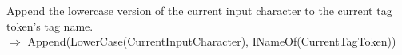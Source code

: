 \documentclass[uplatex,a4j]{jsreport}
\begin{document}
Append the lowercase version of the current input character to the current tag token's tag name.\\
$\Rightarrow$ Append(LowerCase(CurrentInputCharacter), INameOf(CurrentTagToken))\\
\end{document}
